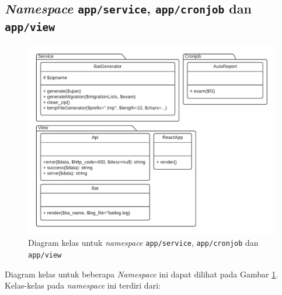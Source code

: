 \subsection{\textit{Namespace} \texttt{app/service}, \texttt{app/cronjob} dan
\texttt{app/view}}
    \begin{figure}
        \centering
        \includegraphics[width=0.75\paperwidth]{Gambar/classmap-be/Classmap - app-service,cronjob,view.pdf}
        \caption{Diagram kelas untuk \textit{namespace} \texttt{app/service},
            \texttt{app/cronjob} dan \texttt{app/view}}
        \label{fig:classmap_app-service,cronjob,view}
    \end{figure}
    Diagram kelas untuk beberapa \textit{Namespace} ini dapat dilihat pada
    Gambar \ref{fig:classmap_app-service,cronjob,view}. Kelas-kelas pada
    \textit{namespace} ini terdiri dari:
